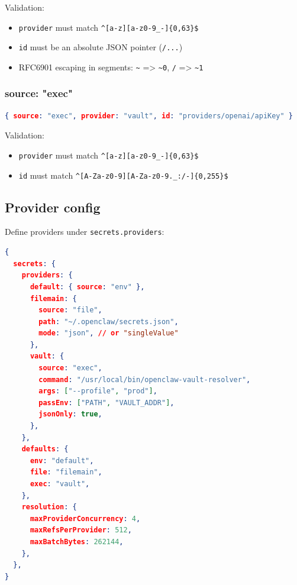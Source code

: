 Validation:

\begin{itemize}
  \item \texttt{provider} must match \texttt{\textasciicircum{}[a-z][a-z0-9\_-]\{0,63\}\$}
  \item \texttt{id} must be an absolute JSON pointer (\texttt{/...})
  \item RFC6901 escaping in segments: \texttt{\textasciitilde{}} => \texttt{\textasciitilde{}0}, \texttt{/} => \texttt{\textasciitilde{}1}
\end{itemize}


\subsubsection{source: "exec"}


\begin{lstlisting}[language=json]
{ source: "exec", provider: "vault", id: "providers/openai/apiKey" }
\end{lstlisting}


Validation:

\begin{itemize}
  \item \texttt{provider} must match \texttt{\textasciicircum{}[a-z][a-z0-9\_-]\{0,63\}\$}
  \item \texttt{id} must match \texttt{\textasciicircum{}[A-Za-z0-9][A-Za-z0-9.\_:/-]\{0,255\}\$}
\end{itemize}


\subsection{Provider config}


Define providers under \texttt{secrets.providers}:

\begin{lstlisting}[language=json]
{
  secrets: {
    providers: {
      default: { source: "env" },
      filemain: {
        source: "file",
        path: "~/.openclaw/secrets.json",
        mode: "json", // or "singleValue"
      },
      vault: {
        source: "exec",
        command: "/usr/local/bin/openclaw-vault-resolver",
        args: ["--profile", "prod"],
        passEnv: ["PATH", "VAULT_ADDR"],
        jsonOnly: true,
      },
    },
    defaults: {
      env: "default",
      file: "filemain",
      exec: "vault",
    },
    resolution: {
      maxProviderConcurrency: 4,
      maxRefsPerProvider: 512,
      maxBatchBytes: 262144,
    },
  },
}
\end{lstlisting}


